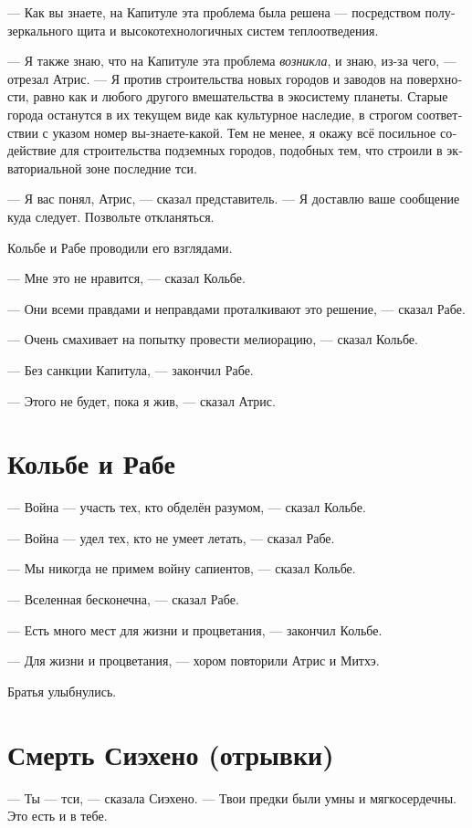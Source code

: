 \documentclass[a4paper,12pt,fleqn]{book}\usepackage{polyglossia}\setdefaultlanguage[babelshorthands=true]{russian}\setotherlanguage{english}\defaultfontfeatures{Ligatures=TeX,Mapping=tex-text}\usepackage{xcolor}\newcommand{\ml}[3]{#2}
\begin{document}
{--- Как вы знаете, на Капитуле эта проблема была решена --- посредством полузеркального щита и высокотехнологичных систем теплоотведения.

--- Я также знаю, что на Капитуле эта проблема \emph{возникла}, и знаю, из-за чего, --- отрезал Атрис.
--- Я против строительства новых городов и заводов на поверхности, равно как и любого другого вмешательства в экосистему планеты.
Старые города останутся в их текущем виде как культурное наследие, в строгом соответствии с указом номер вы-знаете-какой.
Тем не менее, я окажу всё посильное содействие для строительства подземных городов, подобных тем, что строили в экваториальной зоне последние тси.

--- Я вас понял, Атрис, --- сказал представитель.
--- Я доставлю ваше сообщение куда следует.
Позвольте откланяться.

Кольбе и Рабе проводили его взглядами.

--- Мне это не нравится, --- сказал Кольбе.

--- Они всеми правдами и неправдами проталкивают это решение, --- сказал Рабе.

--- Очень смахивает на попытку провести мелиорацию, --- сказал Кольбе.

--- Без санкции Капитула, --- закончил Рабе.

--- Этого не будет, пока я жив, --- сказал Атрис.

\section{Кольбе и Рабе}

--- Война --- участь тех, кто обделён разумом, --- сказал Кольбе.

--- Война --- удел тех, кто не умеет летать, --- сказал Рабе.

--- Мы никогда не примем войну сапиентов, --- сказал Кольбе.

--- Вселенная бесконечна, --- сказал Рабе.

--- Есть много мест для жизни и процветания, --- закончил Кольбе.

--- Для жизни и процветания, --- хором повторили Атрис и Митхэ.

Братья улыбнулись.

\section{Смерть Сиэхено (отрывки)}

--- Ты --- тси, --- сказала Сиэхено.
--- Твои предки были умны и мягкосердечны.
Это есть и в тебе.

}
\end{document}
